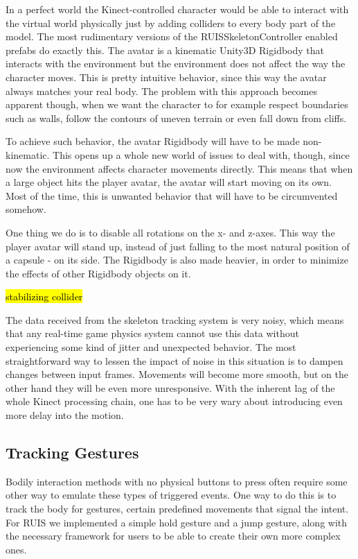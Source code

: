 \documentclass[12pt,a4paper,oneside,pdftex]{report}
\begin{document}
In a perfect world the Kinect-controlled character would be able to interact with the virtual world physically just by adding colliders to every body part of the model. The most rudimentary versions of the RUISSkeletonController enabled prefabs do exactly this. The avatar is a kinematic Unity3D Rigidbody that interacts with the environment but the environment does not affect the way the character moves. This is pretty intuitive behavior, since this way the avatar always matches your real body. The problem with this approach becomes apparent though, when we want the character to for example respect boundaries such as walls, follow the contours of uneven terrain or even fall down from cliffs.

To achieve such behavior, the avatar Rigidbody will have to be made non-kinematic. This opens up a whole new world of issues to deal with, though, since now the environment affects character movements directly. This means that when a large object hits the player avatar, the avatar will start moving on its own. Most of the time, this is unwanted behavior that will have to be circumvented somehow.

One thing we do is to disable all rotations on the x- and z-axes. This way the player avatar will stand up, instead of just falling to the most natural position of a capsule - on its side. The Rigidbody is also made heavier, in order to minimize the effects of other Rigidbody objects on it.

\hl{stabilizing collider}

The data received from the skeleton tracking system is very noisy, which means that any real-time game physics system cannot use this data without experiencing some kind of jitter and unexpected behavior. The most straightforward way to lessen the impact of noise in this situation is to dampen changes between input frames. Movements will become more smooth, but on the other hand they will be even more unresponsive. With the inherent lag of the whole Kinect processing chain, one has to be very wary about introducing even more delay into the motion.

\subsection{Tracking Gestures}
\label{subsection:skeletontracking:gestures}

Bodily interaction methods with no physical buttons to press often require some other way to emulate these types of triggered events. One way to do this is to track the body for gestures, certain predefined movements that signal the intent. For RUIS we implemented a simple hold gesture and a jump gesture, along with the necessary framework for users to be able to create their own more complex ones.
\end{document}
